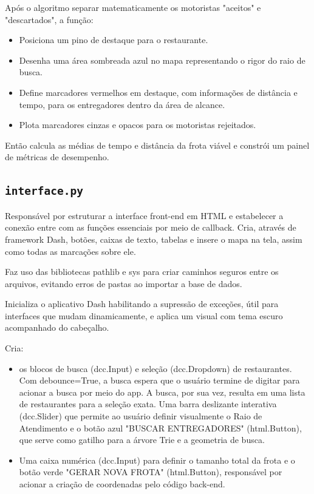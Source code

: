 \documentclass[12pt,a4paper]{article}
\begin{document}
Após o algoritmo separar matematicamente os motoristas "aceitos" e "descartados", a função:
\begin{itemize}
    \item Posiciona um pino de destaque para o restaurante.
    \item Desenha uma área sombreada azul no mapa representando o rigor do raio de busca.
    \item Define marcadores vermelhos em destaque, com informações de distância e tempo, para os entregadores dentro da área de alcance.
    \item Plota marcadores cinzas e opacos para os motoristas rejeitados.
\end{itemize}
Então calcula as médias de tempo e distância da frota viável e constrói um painel de métricas de desempenho.

\subsection{\texttt{interface.py}}

Responsável por estruturar a interface front-end em HTML e estabelecer a conexão entre com as funções essenciais por meio de callback. Cria, através de framework Dash, botões, caixas de texto, tabelas e insere o mapa na tela, assim como todas as marcações sobre ele.

Faz uso das bibliotecas pathlib e sys para criar caminhos seguros entre os arquivos, evitando erros de pastas ao importar a base de dados.

Inicializa o aplicativo Dash habilitando a supressão de exceções, útil para interfaces que mudam dinamicamente, e aplica um visual com tema escuro acompanhado do cabeçalho.

Cria:
\begin{itemize}
    \item os blocos de busca (dcc.Input) e seleção (dcc.Dropdown) de restaurantes. Com debounce=True, a busca espera que o usuário termine de digitar para acionar a busca por meio do app. A busca, por sua vez, resulta em uma lista de restaurantes para a seleção exata. Uma barra deslizante interativa (dcc.Slider) que permite ao usuário definir visualmente o Raio de Atendimento e o botão azul "BUSCAR ENTREGADORES" (html.Button), que serve como gatilho para a árvore Trie e a geometria de busca.
    \item Uma caixa numérica (dcc.Input) para definir o tamanho total da frota e o botão verde "GERAR NOVA FROTA" (html.Button), responsável por acionar a criação de coordenadas pelo código back-end.
\end{itemize}
\end{document}
